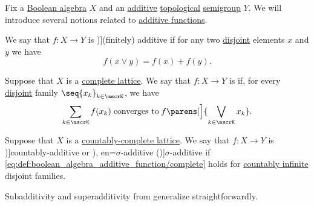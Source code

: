 \begin{definition}\label{def:boolean_algebra_additive_function}\mimprovised
  Fix a \hyperref[def:boolean_algebra]{Boolean algebra} \( X \) and an \hyperref[con:additive_semigroup]{additive} \hyperref[rem:topological_first_order_structures]{topological} \hyperref[def:semigroup]{semigroup} \( Y \). We will introduce several notions related to \hyperref[def:additive_function]{additive functions}.

  \begin{thmenum}
     We say that \( f: X \to Y \) is \term[ru=(конечно) аддитивная (функция), en=finitely additive (\cite[289]{HalmosGivant2009BooleanAlgebras})]{(finitely) additive} if for any two \hyperref[def:disjoint_lattice_elements]{disjoint} elements \( x \) and \( y \) we have
    \begin{equation}\label{eq:def:boolean_algebra_additive_function/finite}
      f(x \vee y) = f(x) + f(y).
    \end{equation}

     Suppose that \( X \) is a \hyperref[def:complete_lattice]{complete lattice}. We say that \( f: X \to Y \) is  if, for every \hyperref[def:disjoint_lattice_elements]{disjoint} family \( \seq{ x_k }_{k \in \mscrK} \), we have
    \begin{equation}\label{eq:def:boolean_algebra_additive_function/complete}
      \sum_{k \in \mscrK} f(x_k) \T{converges to} f\parens[\Big]{ \bigvee_{k \in \mscrK} x_k }.
    \end{equation}

     Suppose that \( X \) is a \hyperref[def:countably_complete_lattice]{countably-complete lattice}. We say that \( f: X \to Y \) is \term[ru=счётно аддитивная (функция), en=countably additive (\cite[289]{HalmosGivant2009BooleanAlgebras})]{countably-additive} or \term[ru=\( \sigma \)-аддитивная (мера) (\cite[def. 2.1]{ДьяченкоУльянов1998ТеорияМеры}), en=\( \sigma \)-additive (\cite[289]{HalmosGivant2009BooleanAlgebras})]{\( \sigma \)-additive} if \eqref{eq:def:boolean_algebra_additive_function/complete} holds for \hyperref[def:set_countability/countably_infinite]{countably infinite} disjoint families.
  \end{thmenum}

  Subadditivity and superadditivity from  generalize straightforwardly.
\end{definition}
